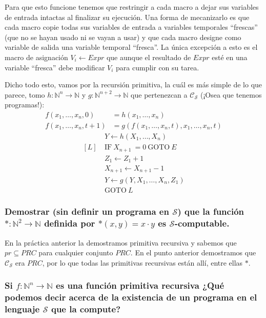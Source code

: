 \documentclass[fleqn, 11pt]{article}
\newcommand{\nat}{\mathbb{N}}
\newcommand{\Ccur}{\mathcal{C}}
\newcommand{\Scur}{\mathcal{S}}
\newcommand{\into}{\leftarrow}
\newcommand{\IF}{\text{IF}}
\newcommand{\GOTO}{\text{GOTO}}
\begin{document}
Para que esto funcione tenemos que restringir a cada macro a dejar sus
variables de entrada intactas al finalizar su ejecución. Una forma de
mecanizarlo es que cada macro copie todas sus variables de entrada a variables
temporales ``frescas'' (que no se hayan usado ni se vayan a usar) y que cada
macro designe como variable de salida una variable temporal ``fresca''. La
única excepción a esto es el macro de asignación $V_i \into Expr$ que aunque el
resultado de $Expr$ esté en una variable ``fresca'' debe modificar $V_i$ para
cumplir con su tarea.

Dicho todo esto, vamos por la recursión primitiva, la cuál es más simple de lo
que parece, tomo $h : \nat^n \to \nat$ y $g : \nat^{n + 2} \to \nat$ que
pertenezcan a $\Ccur_\Scur$ (¡Osea que tenemos programas!):
\begin{align*}
	f(x_1, \dots, x_n, 0)     &= h(x_1, \dots, x_n) \\
	f(x_1, \dots, x_n, t + 1) &= g(f(x_1, \dots, x_n, t),
				       x_1, \dots, x_n, t)
\end{align*}
\begin{align*}
	     &Y \into h(X_1, \dots, X_n) \\
	[L]\ &\IF\ X_{n+1}\ = 0\ \GOTO\ E \\
	     &Z_1 \into Z_1 + 1 \\
	     &X_{n+1} \into X_{n+1} - 1 \\
	     &Y \into g(Y, X_1, \dots, X_n, Z_1) \\
	     &\GOTO\ L
\end{align*}

\subsubsection{Demostrar (sin definir un programa en $\Scur$) que la función
$* : \nat^2 \to \nat$ definida por $*(x, y) = x \cdot y$ es
$\Scur$-computable.}

En la práctica anterior la demostramos primitiva recursiva y sabemos que
$pr \subseteq PRC$ para cualquier conjunto $PRC$. En el punto anterior
demostramos que $\Ccur_\Scur$ era $PRC$, por lo que todas las primitivas
recursivas están allí, entre ellas $*$.

\subsubsection{Si $f : \nat^n \to \nat$ es una función primitiva recursiva ¿Qué
podemos decir acerca de la existencia de un programa en el lenguaje $\Scur$ que
la compute?}
\end{document}
